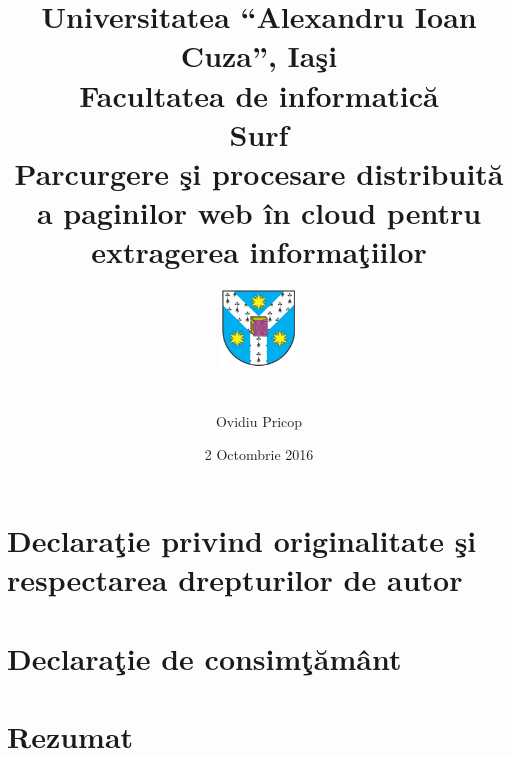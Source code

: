 \documentclass[12pt,oneside]{report}
\newcommand{\GLOBALDATE}{2 Octombrie 2016}
\newcommand{\chaptertitle}[1]{\LARGE{#1}}
\begin{document}
\title{
	\large{Universitatea \enquote{Alexandru Ioan Cuza}, Ia\c{s}i} \\
	\vspace{0.5cm}
	\large{\textbf{Facultatea de informatic\u{a}}} \\
      \vspace{2cm}
	\LARGE{Surf} \\
	\vspace{1cm}
	\large{Parcurgere \c{s}i procesare distribuit\u{a} a paginilor web \^{i}n cloud pentru extragerea informa\c{t}iilor} \\
	\vspace{1cm}
	\vspace{1cm}
	\includegraphics[width=2cm,height=3cm,keepaspectratio]{uaic_sigla.png}
}

\author{Ovidiu Pricop}
\date{\GLOBALDATE}

\maketitle


\chapter*{
	\large{
		Declara\c{t}ie privind originalitate \c{s}i respectarea drepturilor de autor
	}
}



\chapter*{
	\large{
		Declara\c{t}ie de consim\c{t}\u{a}m\^{a}nt
	}
}



\chapter*{\chaptertitle{Rezumat}}

\newpage
\end{document}
